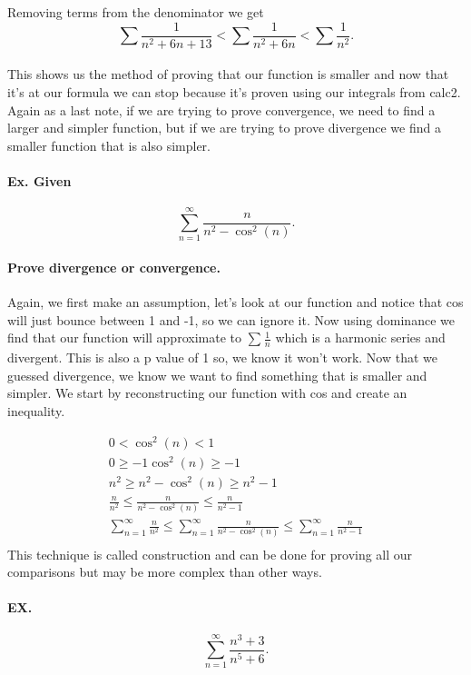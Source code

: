 Removing terms from the denominator we get
\[
\sum_{  } ^{  } \frac{ 1 }{ n^2+6n+13 } < \sum_{  } ^{  } \frac{ 1 }{ n^2+6n } <\sum_{  } ^{  } \frac{ 1 }{ n^2 } 
.\] 

This shows us the method of proving that our function is smaller and now that it's at our formula we can stop because it's proven using our integrals from calc2. Again as a last note, if we are trying to prove convergence, we need to find a larger and simpler function, but if we are trying to prove divergence we find a smaller function that is also simpler.

\paragraph{Ex. Given}
\[
\sum_{ n=1 } ^{ \infty } \frac{ n }{ n^2-\cos^{ 2 } \left( n \right)  } 
.\] 
\paragraph{Prove divergence or convergence. \\}

Again, we first make an assumption, let's look at our function and notice that cos will just bounce between 1 and -1, so we can ignore it. Now using dominance we find that our function will approximate to $ \sum_{  } ^{  } \frac{ 1 }{ n }  $ which is a harmonic series and divergent. This is also a p value of 1 so, we know it won't work. Now that we guessed divergence, we know we want to find something that is smaller and simpler. We start by reconstructing our function with cos and create an inequality.

\begin{gather*}
0<\cos^{ 2 } \left( n \right) <1\\
0\ge -1\cos^{ 2 } \left( n \right) \ge -1 \\
n^2\ge n^2-\cos^{ 2 } \left( n \right) \ge n^2-1 \\
\frac{ n }{ n^2 } \le \frac{ n }{ n^2-\cos^{ 2 } \left( n \right)  } \le \frac{ n }{ n^2-1 } \\
\sum_{ n=1 } ^{ \infty } \frac{ n }{ n^2 } \le \sum_{ n=1 } ^{ \infty }  \frac{ n }{ n^2-\cos^{ 2 } \left( n \right)  } \le \sum_{ n=1 } ^{ \infty } \frac{ n }{ n^2-1 } \\
\end{gather*}
This technique is called construction and can be done for proving all our comparisons but may be more complex than other ways. 

\paragraph{EX.}
\[
\sum_{ n=1 } ^{ \infty } \frac{ n^3+3 }{ n^{ 5 }+6 }
.\] 

